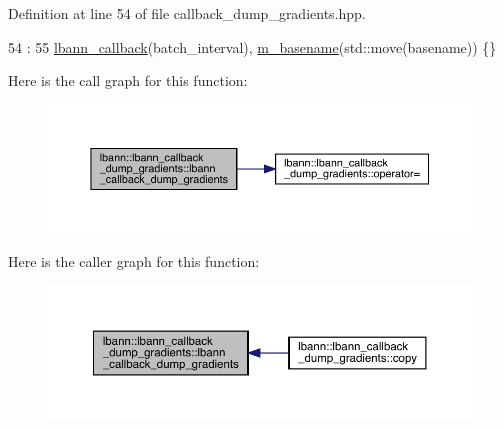 Definition at line 54 of file callback\+\_\+dump\+\_\+gradients.\+hpp.


\begin{DoxyCode}
54                                                                             :
55     \hyperlink{classlbann_1_1lbann__callback_a679057298a41ddd47f08c157f756c584}{lbann\_callback}(batch\_interval), \hyperlink{classlbann_1_1lbann__callback__dump__gradients_a5c8236660ca8b1cb61dddcd1264821ca}{m\_basename}(std::move(basename)) \{\}
\end{DoxyCode}
Here is the call graph for this function\+:\nopagebreak
\begin{figure}[H]
\begin{center}
\leavevmode
\includegraphics[width=350pt]{classlbann_1_1lbann__callback__dump__gradients_a321a8f673578f3a0535b9f8e27e3517a_cgraph}
\end{center}
\end{figure}
Here is the caller graph for this function\+:\nopagebreak
\begin{figure}[H]
\begin{center}
\leavevmode
\includegraphics[width=350pt]{classlbann_1_1lbann__callback__dump__gradients_a321a8f673578f3a0535b9f8e27e3517a_icgraph}
\end{center}
\end{figure}
\mbox{\label{classlbann_1_1lbann__callback__dump__gradients_a71dd307db6a16c35a336ee57a5cab656}} 
